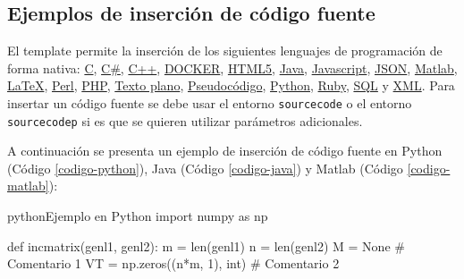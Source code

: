 		\lipsum[4]
		
		\begin{multicols}{2}
			
			\lipsum[4]
			
			
			\lipsum[1]
			
		\end{multicols}
	
	\subsection{Ejemplos de inserción de código fuente}
	
		\newcommand{\insertsrcmanual}[2]{\href{http://latex.ppizarror.com/informe.html\#hlp-srccode\&srctype=#1}{#2}}
	
		El template permite la inserción de los siguientes lenguajes de programación de forma nativa: \insertsrcmanual{c}{C}, \insertsrcmanual{csharp}{C\#}, \insertsrcmanual{cpp}{C++}, \insertsrcmanual{docker}{DOCKER}, \insertsrcmanual{html5}{HTML5}, \insertsrcmanual{java}{Java}, \insertsrcmanual{js}{Javascript}, \insertsrcmanual{json}{JSON}, \insertsrcmanual{matlab}{Matlab}, \insertsrcmanual{latex}{LaTeX}, \insertsrcmanual{perl}{Perl}, \insertsrcmanual{php}{PHP}, \insertsrcmanual{plaintext}{Texto plano}, \insertsrcmanual{pseudocode}{Pseudocódigo}, \insertsrcmanual{python}{Python}, \insertsrcmanual{ruby}{Ruby}, \insertsrcmanual{sql}{SQL} y \insertsrcmanual{xml}{XML}. Para insertar un código fuente se debe usar el entorno \texttt{sourcecode} o el entorno \texttt{sourcecodep} si es que se quieren utilizar parámetros adicionales. \newp
		
		A continuación se presenta un ejemplo de inserción de código fuente en Python (Código \ref{codigo-python}), Java (Código \ref{codigo-java}) y Matlab (Código \ref{codigo-matlab}):
		
\begin{sourcecode}[\label{codigo-python}]{python}{Ejemplo en Python}
import numpy as np

def incmatrix(genl1, genl2):
	m = len(genl1)
	n = len(genl2)
	M = None # Comentario 1
	VT = np.zeros((n*m, 1), int) # Comentario 2
\end{sourcecode}

